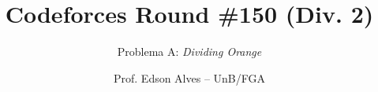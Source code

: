 \title{Codeforces Round \#150 (Div. 2)}
\subtitle{Problema A: \textit{Dividing Orange}}
\author{Prof. Edson Alves -- UnB/FGA}
\date{}
